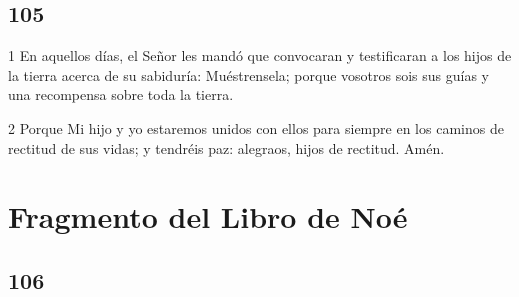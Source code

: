 \chapter{105}

\par 1 En aquellos días, el Señor les mandó que convocaran y testificaran a los hijos de la tierra acerca de su sabiduría: Muéstrensela; porque vosotros sois sus guías y una recompensa sobre toda la tierra.
\par 2 Porque Mi hijo y yo estaremos unidos con ellos para siempre en los caminos de rectitud de sus vidas; y tendréis paz: alegraos, hijos de rectitud. Amén.

\part{Fragmento del Libro de Noé}

\chapter{106}

